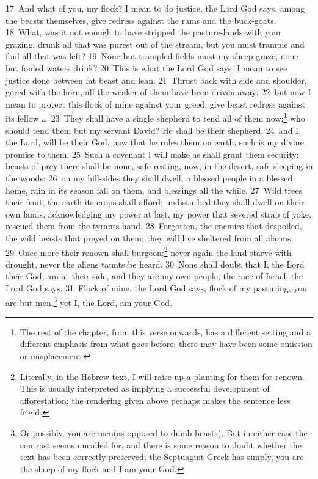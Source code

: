 \documentclass[10pt]{book} %
\begin{document}
\textcolor{benred8}{17}~And what of you, my flock? I mean to do justice, the Lord God says, among the beasts themselves, give redress against the rams and the buck-goats. \textcolor{benred8}{18}~What, was it not enough to have stripped the pasture-lands with your grazing, drunk all that was purest out of the stream, but you must trample and foul all that was left? \textcolor{benred8}{19}~None but trampled fields must my sheep graze, none but fouled waters drink? \textcolor{benred8}{20}~This is what the Lord God says: I mean to see justice done between fat beast and lean. \textcolor{benred8}{21}~Thrust back with side and shoulder, gored with the horn, all the weaker of them have been driven away; \textcolor{benred8}{22}~but now I mean to protect this flock of mine against your greed, give beast redress against its fellow.\ldots\  \textcolor{benred8}{23}~They shall have a single shepherd to tend all of them now;\footnote[2]{The rest of the chapter, from this verse onwards, has a different setting and a different emphasis from what goes before; there may have been some omission or misplacement.} who should tend them but my servant David? He shall be their shepherd, \textcolor{benred8}{24}~and I, the Lord, will be their God, now that he rules them on earth; such is my divine promise to them. \textcolor{benred8}{25}~Such a covenant I will make as shall grant them security; beasts of prey there shall be none, safe resting, now, in the desert, safe sleeping in the woods; \textcolor{benred8}{26}~on my hill-sides they shall dwell, a blessed people in a blessed home, rain in its season fall on them, and blessings all the while. \textcolor{benred8}{27}~Wild trees their fruit, the earth its crops shall afford; undisturbed they shall dwell on their own lands, acknowledging my power at last, my power that severed strap of yoke, rescued them from the tyrant\textquotesingle s hand. \textcolor{benred8}{28}~Forgotten, the enemies that despoiled, the wild beasts that preyed on them; they will live sheltered from all alarms. \textcolor{benred8}{29}~Once more their renown shall burgeon;\footnote[3]{Literally, in the Hebrew text, \textasciigrave I will raise up a planting for them for renown\textquotesingle . This is usually interpreted as implying a successful development of afforestation; the rendering given above perhaps makes the sentence less frigid.} never again the land starve with drought, never the alien\textquotesingle s taunts be heard. \textcolor{benred8}{30}~None shall doubt that I, the Lord their God, am at their side, and they are my own people, the race of Israel, the Lord God says. \textcolor{benred8}{31}~Flock of mine, the Lord God says, flock of my pasturing, you are but men,\footnote[4]{Or possibly, \textasciigrave you are men\textquotesingle  (as opposed to dumb beasts). But in either case the contrast seems uncalled for, and there is some reason to doubt whether the text has been correctly preserved; the Septuagint Greek has simply, \textasciigrave you are the sheep of my flock and I am your God\textquotesingle .} yet I, the Lord, am your God.
\end{document}
